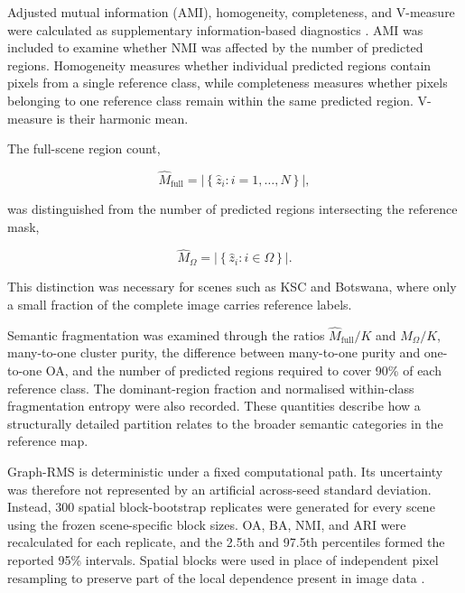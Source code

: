 \documentclass[10pt,a4paper,fleqn]{article}
\begin{document}
Adjusted mutual information (AMI), homogeneity, completeness, and V-measure
were calculated as supplementary information-based diagnostics
\citep{vinh2010}. AMI was included to examine whether NMI was affected by the
number of predicted regions. Homogeneity measures whether individual predicted
regions contain pixels from a single reference class, while completeness
measures whether pixels belonging to one reference class remain within the
same predicted region. V-measure is their harmonic mean.

The full-scene region count,

\begin{equation}
\widehat{M}_{\mathrm{full}}
=
\left|
\left\{
\widehat{z}_i:
i=1,\ldots,N
\right\}
\right|,
\label{eq:full_region_count}
\end{equation}

was distinguished from the number of predicted regions intersecting the
reference mask,

\begin{equation}
\widehat{M}_{\Omega}
=
\left|
\left\{
\widehat{z}_i:
i\in\Omega
\right\}
\right|.
\label{eq:evaluation_region_count}
\end{equation}

This distinction was necessary for scenes such as KSC and Botswana, where only
a small fraction of the complete image carries reference labels.

Semantic fragmentation was examined through the ratios
\(\widehat{M}_{\mathrm{full}}/K\) and
\(\widehat{M}_{\Omega}/K\), many-to-one cluster purity, the difference between
many-to-one purity and one-to-one OA, and the number of predicted regions
required to cover 90\% of each reference class. The dominant-region fraction
and normalised within-class fragmentation entropy were also recorded. These
quantities describe how a structurally detailed partition relates to the
broader semantic categories in the reference map.

Graph-RMS is deterministic under a fixed computational path. Its uncertainty
was therefore not represented by an artificial across-seed standard deviation.
Instead, 300 spatial block-bootstrap replicates were generated for every scene
using the frozen scene-specific block sizes. OA, BA, NMI, and ARI were
recalculated for each replicate, and the 2.5th and 97.5th percentiles formed
the reported 95\% intervals. Spatial blocks were used in place of independent
pixel resampling to preserve part of the local dependence present in image
data \citep{lahiri2003}.
\end{document}
